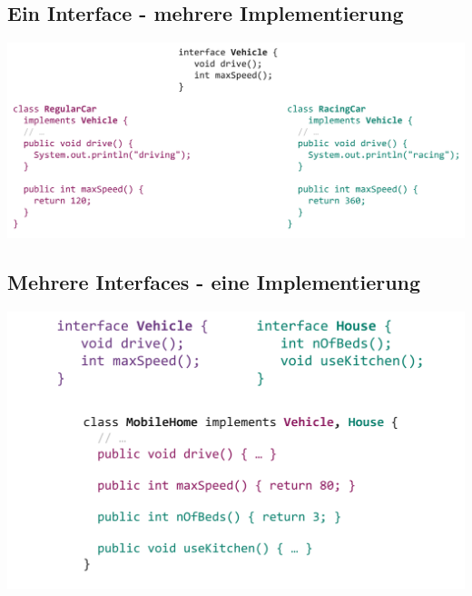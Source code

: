 \subsection{Ein Interface - mehrere Implementierung}
\begin{center}
    \includegraphics[width=0.9\columnwidth]{pictures/interface1-class2.png}
\end{center}

\subsection{Mehrere Interfaces - eine Implementierung}
\begin{center}
    \includegraphics[width=0.9\columnwidth]{pictures/interface2-class1.png}
\end{center}

